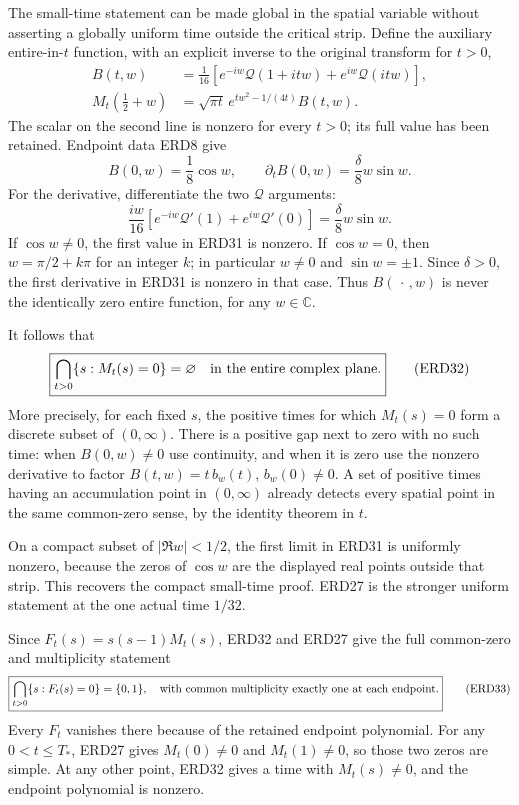 \documentclass[
  10pt,
  a4paper,
]{article}
\begin{document}
The small-time statement can be made global in the spatial variable
without asserting a globally uniform time outside the critical strip.
Define the auxiliary entire-in-\(t\) function, with an explicit inverse
to the original transform for \(t>0\), \[
 \begin{aligned}
 B(t,w)&=\frac1{16}
      [e^{-iw}\mathcal Q(1+itw)+e^{iw}\mathcal Q(itw)],\\
 M_t(\tfrac12+w)
      &=\sqrt{\pi t}\,e^{tw^2-1/(4t)}B(t,w).
 \end{aligned}
 \tag{ERD30}
\] The scalar on the second line is nonzero for every \(t>0\); its full
value has been retained. Endpoint data ERD8 give \[
 B(0,w)=\frac18\cos w,\qquad
 \partial_tB(0,w)=\frac{\delta}{8}w\sin w .
 \tag{ERD31}
\] For the derivative, differentiate the two \(\mathcal Q\) arguments:
\[
 \frac{iw}{16}
   [e^{-iw}\mathcal Q'(1)+e^{iw}\mathcal Q'(0)]
        =\frac{\delta}{8}w\sin w.
\] If \(\cos w\ne0\), the first value in ERD31 is nonzero. If
\(\cos w=0\), then \(w=\pi/2+k\pi\) for an integer \(k\); in particular
\(w\ne0\) and \(\sin w=\pm1\). Since \(\delta>0\), the first derivative
in ERD31 is nonzero in that case. Thus \(B(\,\cdot\,,w)\) is never the
identically zero entire function, for any \(w\in\mathbb C\).

It follows that \[
 \boxed{\displaystyle
 \bigcap_{t>0}\{s:M_t(s)=0\}=\varnothing
       \quad\hbox{in the entire complex plane}.}
 \tag{ERD32}
\] More precisely, for each fixed \(s\), the positive times for which
\(M_t(s)=0\) form a discrete subset of \((0,\infty)\). There is a
positive gap next to zero with no such time: when \(B(0,w)\ne0\) use
continuity, and when it is zero use the nonzero derivative to factor
\(B(t,w)=t\,b_w(t)\), \(b_w(0)\ne0\). A set of positive times having an
accumulation point in \((0,\infty)\) already detects every spatial point
in the same common-zero sense, by the identity theorem in \(t\).

On a compact subset of \(|\Re w|<1/2\), the first limit in ERD31 is
uniformly nonzero, because the zeros of \(\cos w\) are the displayed
real points outside that strip. This recovers the compact small-time
proof. ERD27 is the stronger uniform statement at the one actual time
\(1/32\).

Since \(F_t(s)=s(s-1)M_t(s)\), ERD32 and ERD27 give the full common-zero
and multiplicity statement \[
 \boxed{\displaystyle
 \bigcap_{t>0}\{s:F_t(s)=0\}=\{0,1\},
 \quad\hbox{with common multiplicity exactly one at each endpoint}.}
 \tag{ERD33}
\] Every \(F_t\) vanishes there because of the retained endpoint
polynomial. For any \(0<t\le T_*\), ERD27 gives \(M_t(0)\ne0\) and
\(M_t(1)\ne0\), so those two zeros are simple. At any other point, ERD32
gives a time with \(M_t(s)\ne0\), and the endpoint polynomial is
nonzero.
\end{document}
